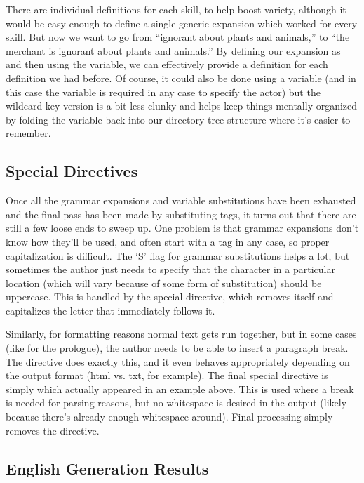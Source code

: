 There are individual  definitions for each skill, to help boost variety, although it would be easy enough to define a single generic expansion which worked for every skill.
%
But now we want to go from ``ignorant about plants and animals,'' to ``the merchant is ignorant about plants and animals.''
%
By defining our expansion as  and then using the \exchar{\_} variable, we can effectively provide a  definition for each  definition we had before.
%
Of course, it could also be done using a variable (and in this case the variable  is required in any case to specify the actor) but the wildcard key version is a bit less clunky and helps keep things mentally organized by folding the variable back into our directory tree structure where it's easier to remember.

\subsection{Special Directives}

Once all the grammar expansions and variable substitutions have been exhausted and the final pass has been made by substituting tags, it turns out that there are still a few loose ends to sweep up.
%
One problem is that grammar expansions don't know how they'll be used, and often start with a tag in any case, so proper capitalization is difficult.
%
The `S' flag for grammar substitutions helps a lot, but sometimes the author just needs to specify that the character in a particular location (which will vary because of some form of substitution) should be uppercase.
%
This is handled by the special  directive, which removes itself and capitalizes the letter that immediately follows it.


Similarly, for formatting reasons normal text gets run together, but in some cases (like for the prologue), the author needs to be able to insert a paragraph break.
%
The  directive does exactly this, and it even behaves appropriately depending on the output format (html vs. txt, for example).
%
The final special directive is simply  which actually appeared in an example above.
%
This is used where a break is needed for parsing reasons, but no whitespace is desired in the output (likely because there's already enough whitespace around).
%
Final processing simply removes the  directive.


\subsection{English Generation Results}

